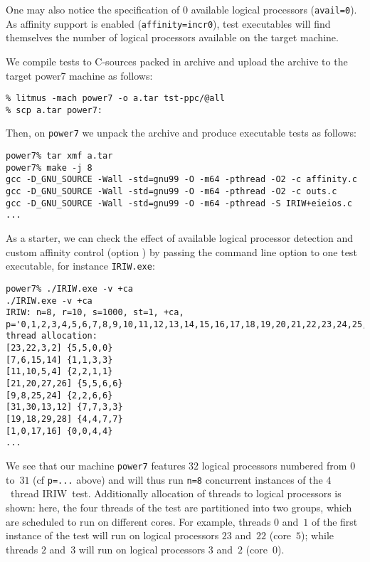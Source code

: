 One may also notice the specification of $0$ available logical processors
(\verb+avail=0+).
As affinity support is enabled (\verb+affinity=incr0+),
test executables will find themselves
the number of logical processors available on the target machine.


We compile tests to C-sources packed in archive 
and upload the archive to the target power7 machine as follows:
\begin{verbatim}
% litmus -mach power7 -o a.tar tst-ppc/@all
% scp a.tar power7:
\end{verbatim}
Then, on \texttt{power7} we unpack the archive and produce executable tests
as follows:
\begin{verbatim}
power7% tar xmf a.tar
power7% make -j 8
gcc -D_GNU_SOURCE -Wall -std=gnu99 -O -m64 -pthread -O2 -c affinity.c
gcc -D_GNU_SOURCE -Wall -std=gnu99 -O -m64 -pthread -O2 -c outs.c
gcc -D_GNU_SOURCE -Wall -std=gnu99 -O -m64 -pthread -S IRIW+eieios.c
...
\end{verbatim}

As a starter, we can check the effect of available logical processor detection
and custom affinity control (option )
by passing the command line option  to one test executable,
for instance
\texttt{IRIW.exe}:
\begin{verbatim}
power7% ./IRIW.exe -v +ca
./IRIW.exe -v +ca
IRIW: n=8, r=10, s=1000, st=1, +ca, p='0,1,2,3,4,5,6,7,8,9,10,11,12,13,14,15,16,17,18,19,20,21,22,23,24,25,26,27,28,29,30,31'
thread allocation: 
[23,22,3,2] {5,5,0,0}
[7,6,15,14] {1,1,3,3}
[11,10,5,4] {2,2,1,1}
[21,20,27,26] {5,5,6,6}
[9,8,25,24] {2,2,6,6}
[31,30,13,12] {7,7,3,3}
[19,18,29,28] {4,4,7,7}
[1,0,17,16] {0,0,4,4}
...
\end{verbatim}
We see that our machine \texttt{power7} features $32$ logical processors
numbered from $0$ to~$31$
(cf \verb+p=...+ above) and will thus run \verb+n=8+ concurrent
instances of the $4$~thread IRIW~test.
Additionally allocation of threads to logical processors is shown:
here, the four threads of the test are partitioned into two groups, which are
scheduled to run on different cores. For example, threads $0$ and~$1$ of
the first instance of the test will run on logical processors $23$ and~$22$
(core~$5$); while threads $2$ and~$3$ will run on logical
processors $3$ and~$2$ (core~$0$).

